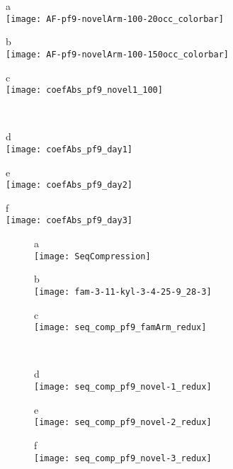 \documentclass[11pt]{article}
\begin{document}

\begin{figure*}[htbp]
    \parbox[t]{1.5in} { {\sf a} \\
        \texttt{[image: AF-pf9-novelArm-100-20occ\_colorbar]}
    } \hskip-2mm
    \parbox[t]{2.2in} { {\sf b} \\
        \texttt{[image: AF-pf9-novelArm-100-150occ\_colorbar]}
    } \hskip-2mm
    \parbox[t]{2in} { {\sf c} \\
        \texttt{[image: coefAbs\_pf9\_novel1\_100]}
    }
    \\
    \parbox[t]{2in} { {\sf d} \\
        \texttt{[image: coefAbs\_pf9\_day1]}
    } %
    \parbox[t]{2in} { {\sf e} \\
        \texttt{[image: coefAbs\_pf9\_day2]}
    } %
    \parbox[t]{2in} { {\sf f} \\
        \texttt{[image: coefAbs\_pf9\_day3]}
    }
    \caption{ } %
\end{figure*}


\begin{figure}[htbp]
    \parbox[t]{1.5in} { {\sf a}\\
        \texttt{[image: SeqCompression]}
    }
    \parbox[t]{1.5in} { {\sf b} \\
        \texttt{[image: fam-3-11-kyl-3-4-25-9\_28-3]}
    }
    \parbox[t]{1.5in} { {\sf c} \\
        \texttt{[image: seq\_comp\_pf9\_famArm\_redux]}
    }\\
    \parbox[t]{1.5in} { {\sf d} \\
        \texttt{[image: seq\_comp\_pf9\_novel-1\_redux]}
    }
    \parbox[t]{1.5in} { {\sf e} \\
        \texttt{[image: seq\_comp\_pf9\_novel-2\_redux]}
    }
    \parbox[t]{1.5in} { {\sf f} \\
        \texttt{[image: seq\_comp\_pf9\_novel-3\_redux]}
    }
    \caption{ } %
\end{figure}
\end{document}
